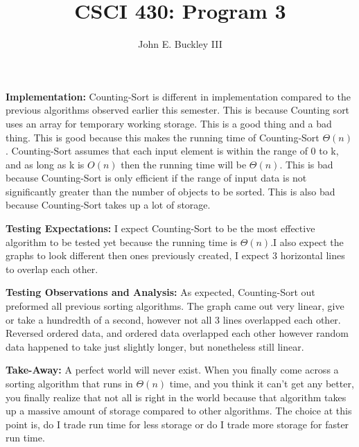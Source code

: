 \documentclass[12pt]{article}
\author{John E. Buckley III}
\title{CSCI 430: Program 3}
\newcommand\tab[1][1cm]{\hspace*{#1}}
\begin{document}
\maketitle

\textbf{Implementation:} \newline
\tab Counting-Sort is different in implementation compared to the previous algorithms observed earlier this semester. This is because Counting sort uses an array for temporary working storage. This is a good thing and a bad thing. This is good because this makes the running time of Counting-Sort $\Theta(n)$. Counting-Sort assumes that each input element is within the range of 0 to k, and as long as k is $O(n)$ then the running time will be $\Theta(n)$. This is bad because Counting-Sort is only efficient if the range of input data is not significantly greater than the number of objects to be sorted. This is also bad because Counting-Sort takes up a lot of storage. \newline \newline

\textbf{Testing Expectations:} \newline
\tab I expect Counting-Sort to be the most effective algorithm to be tested yet because the running time is $\Theta(n)$.I also expect the graphs to look different then ones previously created, I expect 3 horizontal lines to overlap each other. \newline \newline

\textbf{Testing Observations and Analysis:} \newline
\tab As expected, Counting-Sort out preformed all previous sorting algorithms. The graph came out very linear, give or take a hundredth of a second, however not all 3 lines overlapped each other. Reversed ordered data, and ordered data overlapped each other however random data happened to take just slightly longer, but nonetheless still linear. \newline \newline

\textbf{ Take-Away:} \newline
\tab A perfect world will never exist. When you finally come across a sorting algorithm that runs in $\Theta(n)$ time, and you think it can't get any better, you finally realize that not all is right in the world because that algorithm takes up a massive amount of storage compared to other algorithms. The choice at this point is, do I trade run time for less storage or do I trade more storage for faster run time.
\end{document}
